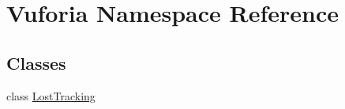 \hypertarget{namespace_vuforia}{}\section{Vuforia Namespace Reference}
\label{namespace_vuforia}
\subsection*{Classes}
\begin{DoxyCompactItemize}
\item 
class \hyperlink{class_vuforia_1_1_lost_tracking}{Lost\+Tracking}
\end{DoxyCompactItemize}
